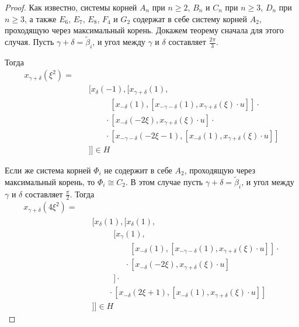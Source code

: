 \documentclass[12pt]{matmex-diploma}
\theoremstyle{mystyleni}
\theoremstyle{mystyle}
\renewcommand{\ge}{\geqslant}
\begin{document}
\begin{proof}
Как известно, системы корней $A_n$ при $n\ge 2$, $B_n$ и $C_n$ при $n\ge 3$, $D_n$ при $n\ge 3$, а также $E_6$, $E_7$, $E_8$, $F_4$ и $G_2$ содержат в себе систему корней $A_2$, проходящую через максимальный корень. Докажем теорему сначала для этого случая. Пусть $\gamma+\delta=\widetilde\beta_i$, и угол между $\gamma$ и $\delta$ составляет $\frac{2\pi}{3}$.

Тогда
\begin{equation*}
\begin{split}
x_{\gamma+\delta}(\xi^2) = & \\
& \quad [x_\delta(-1),[x_{\gamma+\delta}(1), \\
& \quad\qquad \phantom{{}\cdot{}} [x_{-\delta}(1),[x_{-\gamma-\delta}(1),x_{\gamma+\delta}(\xi) \cdot u]] \cdot {} \\
& \quad\qquad \cdot [x_{-\delta}(-2\xi),x_{\gamma+\delta}(\xi) \cdot u] \cdot {} \\
& \quad\qquad \cdot [x_{-\gamma-\delta}(-2\xi-1),[x_{-\delta}(1),x_{\gamma+\delta}(\xi) \cdot u]] \\
& \quad ]] \in H
\end{split}
\end{equation*}

Если же система корней $\Phi_i$ не содержит в себе $A_2$, проходящую через максимальный корень, то $\Phi_i \cong C_2$. В этом случае пусть $\gamma+\delta=\widetilde\beta_i$, и угол между $\gamma$ и $\delta$ составляет $\frac{\pi}{2}$.
Тогда
\begin{equation*}
\begin{split}
x_{\gamma+\delta}(4\xi^2) = & \\
& \quad [x_\delta(1),[x_\delta(1), \\
& \quad\qquad \phantom{{}\cdot{}} [x_\gamma(1),\\
& \quad\qquad\qquad \phantom{{}\cdot{}} [x_{-\delta}(1),[x_{-\gamma-\delta}(1),x_{\gamma+\delta}(\xi ) \cdot u]] \cdot{} \\
& \quad\qquad\qquad {}\cdot [x_{-\delta}(-2 \xi ),x_{\gamma+\delta}(\xi ) \cdot u]\\
& \quad\qquad \phantom{{}\cdot{}} ] \cdot{} \\
& \quad\qquad {}\cdot [x_{-\delta}(2 \xi +1),[x_{-\delta}(1),x_{\gamma+\delta}(\xi ) \cdot u]] \\
& \quad ]] \in H
\end{split}
\end{equation*}
\end{proof}
\end{document}
